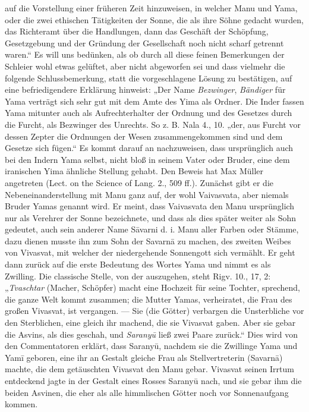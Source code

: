 \documentclass{article}
\begin{document}
auf die Vorstellung einer früheren Zeit hinzuweisen, in welcher Manu und Yama, oder die zwei ethischen Tätigkeiten der Sonne, die als ihre Söhne gedacht wurden, das Richteramt über die Handlungen, dann das Geschäft der Schöpfung, Gesetzgebung und der Gründung der Gesellschaft noch nicht scharf getrennt waren.“ Es will uns bedünken, als ob durch all diese feinen Bemerkungen der Schleier wohl etwas gelüftet, aber nicht abgeworfen sei und dass vielmehr die folgende Schlussbemerkung, statt die vorgeschlagene Lösung zu bestätigen, auf eine befriedigendere Erklärung hinweist: „Der Name \emph{Bezwinger}, \emph{Bändiger} für Yama verträgt sich sehr gut mit dem Amte des Yima als Ordner. Die Inder fassen Yama mitunter auch als Aufrechterhalter der Ordnung und des Gesetzes durch die Furcht, als Bezwinger des Unrechts. So z. B. Nala 4., 10. „der, aus Furcht vor dessen Zepter die Ordnungen der Wesen zusammengekommen sind und dem Gesetze sich fügen.“ Es kommt darauf an nachzuweisen, dass ursprünglich auch bei den Indern Yama selbst, nicht bloß in seinem Vater oder Bruder, eine dem iranischen Yima ähnliche Stellung gehabt. Den Beweis hat Max Müller angetreten (Lect. on the Science of Lang. 2., 509 ff.). Zunächst gibt er die Nebeneinanderstellung mit Manu ganz auf, der wohl Vaivasvata, aber niemals Bruder Yamas genannt wird. Er meint, dass Vaivasvata den Manu ursprünglich nur als Verehrer der Sonne bezeichnete, und dass als dies später weiter als Sohn gedeutet, auch sein anderer Name S\={a}varni d. i. Manu aller Farben oder Stämme, dazu dienen musste ihn zum Sohn der Savarn\={a} zu machen, des zweiten Weibes von Vivasvat, mit welcher der niedergehende Sonnengott sich vermählt. Er geht dann zurück auf die erste Bedeutung des Wortes Yama und nimmt es als Zwilling. Die classische Stelle, von der auszugehen, steht Rigv. 10., 17, 2: „\emph{Tvaschtar} (Macher, Schöpfer) macht eine Hochzeit für seine Tochter, sprechend, die ganze Welt kommt zusammen; die Mutter Yamas, verheiratet, die Frau des großen Vivasvat, ist vergangen. — Sie (die Götter) verbargen die Unsterbliche vor den Sterblichen, eine gleich ihr machend, die sie Vivasvat gaben. Aber sie gebar die Asvins, als dies geschah, und \emph{Sarany\={u}} ließ zwei Paare zurück.“ Dies wird von den Commentatoren erklärt, dass Sarany\={u}, nachdem sie die Zwillinge Yama und Yam\={i} geboren, eine ihr an Gestalt gleiche Frau als Stellvertreterin (Savarn\={a}) machte, die dem getäuschten Vivasvat den Manu gebar. Vivasvat seinen Irrtum entdeckend jagte in der Gestalt eines Rosses Sarany\={u} nach, und sie gebar ihm die beiden Asvinen, die eher als alle himmlischen Götter noch vor Sonnenaufgang kommen.
\end{document}
